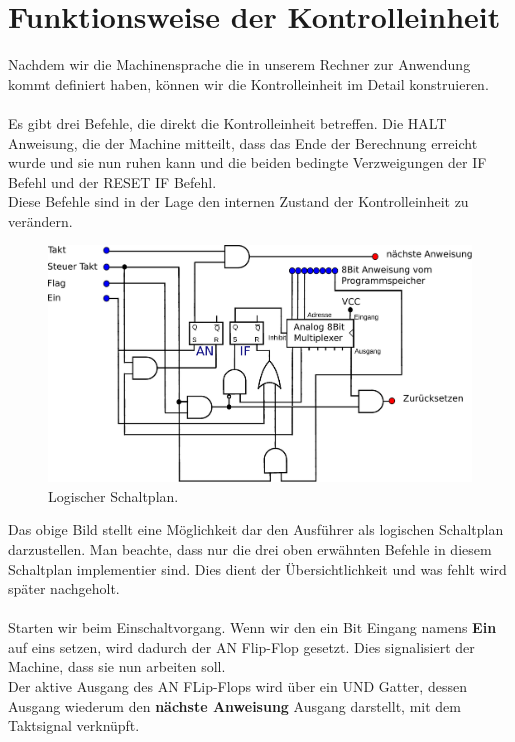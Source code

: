 \documentclass[11pt,a4paper,leqno]{report}
\numberwithin{equation}{chapter}
\begin{document}
\section{Funktionsweise der Kontrolleinheit}
Nachdem wir die Machinensprache die in unserem Rechner zur Anwendung kommt definiert haben, k\"onnen wir die Kontrolleinheit im Detail konstruieren.\\
\\
Es gibt drei Befehle, die direkt die Kontrolleinheit betreffen. Die HALT Anweisung, die der Machine mitteilt, dass das Ende der Berechnung erreicht wurde und sie nun ruhen kann und die beiden bedingte Verzweigungen der IF Befehl und der RESET IF Befehl.\\
Diese Befehle sind in der Lage den internen Zustand der Kontrolleinheit zu ver\"andern.
\begin{figure}[H]
	\begin{center}
		\includegraphics[scale=0.6]{Bilder/ausfuhrer.pdf}
		\caption{Logischer Schaltplan.}
	\end{center}
\end{figure}
\noindent
Das obige Bild stellt eine M\"oglichkeit dar den Ausf\"uhrer als logischen Schaltplan darzustellen. Man beachte, dass nur die drei oben erw\"ahnten Befehle in diesem Schaltplan implementier sind. Dies dient der \"Ubersichtlichkeit und was fehlt wird sp\"ater nachgeholt.\\
\\
Starten wir beim Einschaltvorgang. Wenn wir den ein Bit Eingang namens \textbf{Ein} auf eins setzen, wird dadurch der AN Flip-Flop gesetzt. Dies signalisiert der Machine, dass sie nun arbeiten soll.\\
Der aktive Ausgang des AN FLip-Flops wird \"uber ein UND Gatter, dessen Ausgang wiederum den \textbf{n\"achste Anweisung} Ausgang darstellt, mit dem Taktsignal verkn\"upft.
\end{document}
